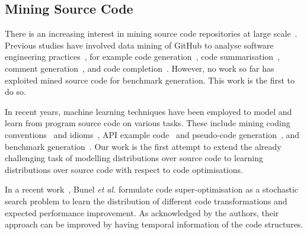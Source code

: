 \subsection{Mining Source Code}

There is an increasing interest in mining source code repositories at large scale~\cite{Allamanis2013a,White2015a,Bird2009}. Previous studies have involved data mining of GitHub to analyse software engineering practices~\cite{Wu2014,Guzman2014,Baishakhi2014a,Vasilescu2015}, for example code generation~\cite{Zhang2015a}, code summarisation~\cite{Allamanis2016}, comment generation~\cite{Wong2013}, and code completion~\cite{Raychev2014}. However, no work so far has exploited mined source code for benchmark generation. This work is the first to do so.

In recent years, machine learning techniques have been employed to model and learn from program source code on various tasks. These include mining coding conventions~\cite{Allamanis2014a} and idioms~\cite{Allamanis2014}, API example code~\cite{Zhang2015a} and pseudo-code generation~\cite{Oda2015}, and benchmark generation~\cite{Cummins2017a}. Our work is the first attempt to extend the already challenging task of modelling distributions over source code to learning distributions over source code with respect to code optimisations.

In a recent work~\cite{Bunel2017a}, Bunel \emph{et al.} formulate code super-optimisation as a stochastic search problem to learn the distribution of different code transformations and expected performance improvement. As acknowledged by the authors, their approach can be improved by having temporal information of the code structures.
